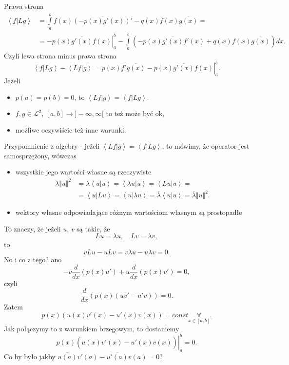 \documentclass[../main.tex]{subfiles}
\begin{document}
		Prawa strona
		\begin{align*}
				\left<f|Lg \right> &= \int\limits_a^bf(x)\overline{\left( -p(x)g'(x) \right) '}  - q(x)f(x)\overline{g(x)} = \\
				&= -\left.p(x)\overline{g'(x)}f(x)\right|_a^b - \int\limits_a^b\left( -p(x)\overline{g'(x)} f'(x) + q(x)f(x)\overline{g(x)}  \right) dx
		.\end{align*}
		Czyli lewa strona minus prawa strona
		\[
				\left<f|Lg \right> - \left<Lf|g \right> = \left.p(x)f'\overline{g(x)} - p(x)\overline{g'(x)} f(x)\right|_a^b
		.\]
		Jeżeli
		\begin{itemize}
				\item $p(a) = p(b) = 0$, to $\left<Lf|g \right> = \left<f|Lg \right>$.
				\item $f,g\in \mathcal{L}^2$, $[a,b]\to]-\infty,\infty[$ to też może być ok,
				\item możliwe oczywiście też inne warunki.
		\end{itemize}
		Przypomnienie z algebry - jeżeli $\left<Lf|g \right> = \left<f|Lg \right>$, to mówimy, że operator jest samosprzężony, wówczas
		\begin{itemize}
				\item wszystkie jego wartości własne są rzeczywiste
						\begin{align*}
								\lambda\Vert u \Vert ^2 &= \lambda \left<u|u \right> = \left<\lambda u|u \right> = \left<L u|u \right> =\\
						&= \left<u|Lu \right> = \left<u|\lambda u \right> = \overline{\lambda} \left<u|u \right> = \overline{\lambda} \Vert u \Vert ^2
						.\end{align*}
				\item wektory własne odpowiadające różnym wartościom własnym są prostopadłe
		\end{itemize}
		To znaczy, że jeżeli $u$, $v$ są takie, że
		\[
		Lu = \lambda u,\quad Lv = \lambda v
		,\]
		to
		\[
		v L u - u L v = v \lambda u - u \lambda v = 0
		.\]
		No i co z tego? ano
		\[
				-v \frac{d}{dx}\left( p(x)u' \right) + u \frac{d}{dx}\left( p(x) v' \right) = 0
		,\]
		czyli
		\[
				\frac{d}{dx}\left( p(x)(uv' - u'v) \right) = 0
		.\]
		Zatem
		\[
				p(x) \left( u(x)v'(x) - u'(x)v(x) \right) = const \underset{x\in[a,b]}{\forall}
		.\]
		Jak połączymy to z warunkiem brzegowym, to dostaniemy
		\[
				p(x) \left. \left( \overline{u(x)} v'(x) - \overline{u'(x)} v(x) \right) \right|_a^b = 0
		.\]
		Co by było jakby $\overline{u(a)} v'(a) - \overline{u'(a)} v(a) = 0$?\\
\end{document}
